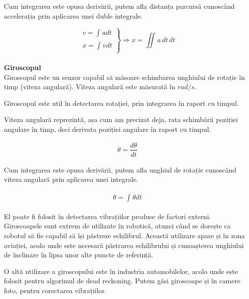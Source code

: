 \documentclass[12pt,a4paper]{article}
\begin{document}
Cum integrarea este opusa derivării, putem afla distanța parcursă cunoscând accelerația prin aplicarea unei duble integrale.

\begin{equation} 
\left.
\begin{aligned} v = \int_{}^{} a dt\\ x = \int_{}^{} v dt \end{aligned} \right\} \Rightarrow x = \iint_{} a \,dt\,dt
\end{equation}\\


\textbf{Giroscopul}\\
Giroscopul este un senzor capabil să măsoare schimbarea unghiului de rotație în timp (viteza angulară). Viteza angulară este măsurată în $rad/s$.

Giroscopul este util în detectarea rotației, prin integrarea în raport cu timpul. 

Viteza angulară reprezintă, așa cum am precizat deja, rata schimbării poziției angulare în timp, deci derivata poziției angulare în raport cu timpul.

\begin{equation} 
\left.
\begin{aligned} \dot{\theta} = \dfrac{d \theta}{dt} \end{aligned}
\right.
\end{equation} 

Cum integrarea este opusa derivării, putem afla unghiul de rotație cunoscând viteza angulară prin aplicarea unei integrale.

\begin{equation} 
\left.
\begin{aligned} \theta = \int_{}^{} \dot{\theta} dt \end{aligned}
\right.
\end{equation} 

El poate fi folosit în detectarea vibrațiilor produse de factori externi. Giroscoapele sunt extrem de utilizate în robotică, atunci când se dorește ca robotul să fie capabil să își păstreze echilibrul. Această utilizare apare și în zona aviației, acolo unde este necesară păstrarea echilibrului și cunoașterea unghiului de înclinare în lipsa unor alte puncte de referință.

O altă utilizare a giroscopului este în industria automobilelor, acolo unde este folosit pentru algorimul de dead reckoning. Putem găsi giroscoape și în camere foto, pentru corectarea vibrațiilor.
\end{document}
